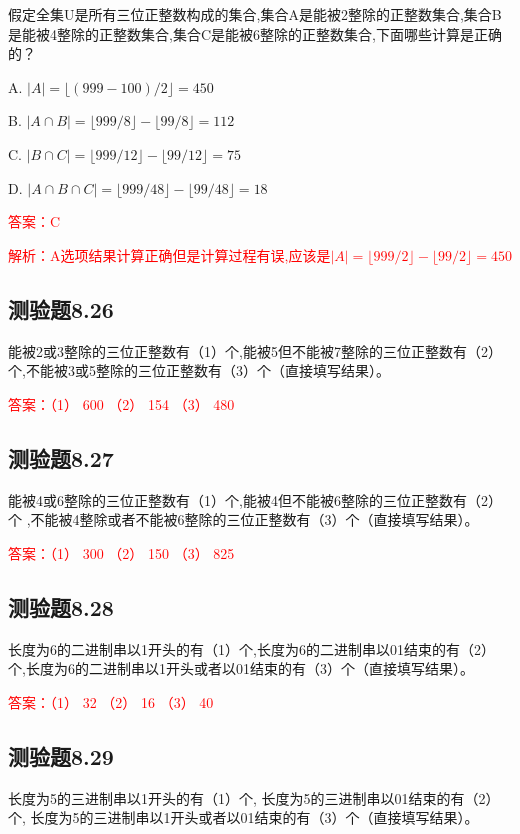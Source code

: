 \documentclass[UTF8, heading=true]{ctexart}
\begin{document}
假定全集U是所有三位正整数构成的集合,集合A是能被2整除的正整数集合,集合B是能被4整除的正整数集合,集合C是能被6整除的正整数集合,下面哪些计算是正确的？

A. $|A|=\lfloor(999-100) / 2\rfloor=450$

B. $|A \cap B|=\lfloor 999 / 8\rfloor-\lfloor 99 / 8\rfloor=112$

C. $|B \cap C|=\lfloor 999 / 12\rfloor-\lfloor 99 / 12\rfloor=75$

D. $|A \cap B \cap C|=\lfloor 999 / 48\rfloor-\lfloor 99 / 48\rfloor=18$

\textcolor{red}{答案：C}

\textcolor{red}{解析：A选项结果计算正确但是计算过程有误,应该是$|A|=\lfloor 999 / 2\rfloor - \lfloor 99 / 2\rfloor=450$}

\subsection{测验题8.26}


能被2或3整除的三位正整数有（1）个,能被5但不能被7整除的三位正整数有（2）个,不能被3或5整除的三位正整数有（3）个（直接填写结果）。

\textcolor{red}{答案：（1） 600 （2） 154 （3） 480}

\subsection{测验题8.27}
能被4或6整除的三位正整数有（1）个,能被4但不能被6整除的三位正整数有（2）个
,不能被4整除或者不能被6整除的三位正整数有（3）个（直接填写结果）。

\textcolor{red}{答案：（1） 300 （2） 150 （3） 825}

\subsection{测验题8.28}

长度为6的二进制串以1开头的有（1）个,长度为6的二进制串以01结束的有（2）个,长度为6的二进制串以1开头或者以01结束的有（3）个（直接填写结果）。

\textcolor{red}{答案：（1） 32 （2） 16 （3） 40}

\subsection{测验题8.29}

长度为5的三进制串以1开头的有（1）个,
长度为5的三进制串以01结束的有（2）个,
长度为5的三进制串以1开头或者以01结束的有（3）个（直接填写结果）。
\end{document}

